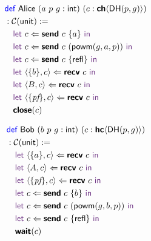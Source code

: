 \begin{center}
\begin{minipage}{0.45\textwidth}
\begingroup
\small
\addtolength{\jot}{-0.2em}
\begin{alignat*}{4}
  &\Def\ \textsf{Alice}\ (a\ p\ g: \textsf{int})\ (c : \CH{\textsf{DH}(p,g)}) \\
  &: \CM{\textsf{unit}} := \\
  &\quad\Let\ c \Leftarrow \Send\ c\ \{ a \}\ \In \\
  &\quad\Let\ c \Leftarrow \Send\ c\ (\textsf{powm}(g, a, p))\ \In \\
  &\quad\Let\ c \Leftarrow \Send\ c\ \{\textsf{refl}\}\ \In \\
  &\quad\Let\ \langle{\{b\}, c}\rangle \Leftarrow \Recv\ c\ \In \\
  &\quad\Let\ \langle{B, c}\rangle \Leftarrow \Recv\ c\ \In \\
  &\quad\Let\ \langle{\{\textit{pf}\}, c}\rangle \Leftarrow \Recv\ c\ \In \\
  &\quad\Close(c)
\end{alignat*}
\endgroup
\end{minipage}
\begin{minipage}{0.5\textwidth}
\begingroup
\small
\addtolength{\jot}{-0.2em}
\begin{alignat*}{4}
  &\Def\ \textsf{Bob}\ (b\ p\ g: \textsf{int})\ (c : \HC{\textsf{DH}(p,g)}) \\
  &: \CM{\textsf{unit}} := \\
  &\quad\Let\ \langle{\{a\}, c}\rangle \Leftarrow \Recv\ c\ \In \\
  &\quad\Let\ \langle{A, c}\rangle \Leftarrow \Recv\ c\ \In \\
  &\quad\Let\ \langle{\{\textit{pf}\}, c}\rangle \Leftarrow \Recv\ c\ \In \\
  &\quad\Let\ c \Leftarrow \Send\ c\ \{ b \}\ \In \\
  &\quad\Let\ c \Leftarrow \Send\ c\ (\textsf{powm}(g, b, p))\ \In \\
  &\quad\Let\ c \Leftarrow \Send\ c\ \{\textsf{refl}\}\ \In \\
  &\quad\Wait(c)
\end{alignat*}
\endgroup
\end{minipage}
\end{center}
\vspace{0.5em}


